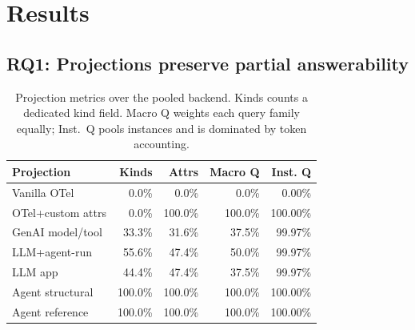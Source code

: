 \documentclass[conference]{IEEEtran}
\begin{document}
\section{Results}
\label{sec:results}

\subsection{RQ1: Projections preserve partial answerability}
\label{sec:rq1}

\begin{table}[t]
\centering
\scriptsize
\caption{Projection metrics over the pooled backend. Kinds counts a
dedicated kind field. Macro Q weights each query family equally; Inst.\
Q pools instances and is dominated by token accounting.}
\label{tab:interop}
\begin{tabular}{@{}lrrrr@{}}
\toprule
Projection & Kinds & Attrs & Macro Q & Inst. Q \\
\midrule
Vanilla OTel & 0.0\% & 0.0\% & 0.0\% & 0.00\% \\
OTel+custom attrs & 0.0\% & 100.0\% & 100.0\% & 100.00\% \\
GenAI model/tool & 33.3\% & 31.6\% & 37.5\% & 99.97\% \\
LLM+agent-run & 55.6\% & 47.4\% & 50.0\% & 99.97\% \\
LLM app & 44.4\% & 47.4\% & 37.5\% & 99.97\% \\
Agent structural & 100.0\% & 100.0\% & 100.0\% & 100.00\% \\
Agent reference & 100.0\% & 100.0\% & 100.0\% & 100.00\% \\
\bottomrule
\end{tabular}
\end{table}
\end{document}
